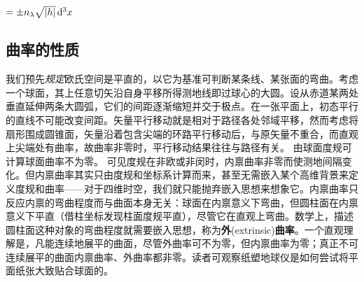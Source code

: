 $=\pm n_\lambda \sqrt{|h|}\dd[3]{x}$


\subsection{曲率的性质}\label{sec:curvature}

我们预先\textit{规定}欧氏空间是平直的，以它为基准可判断某条线、某张面的弯曲。考虑一个球面，其上任意切矢沿自身平移所得测地线即过球心的大圆。设从赤道某两处垂直延伸两条大圆弧，它们的间距逐渐缩短并交于极点。在一张平面上，初态平行的直线不可能改变间距。矢量平行移动就是相对于路径各处邻域平移，然而考虑将扇形围成圆锥面，矢量沿着包含尖端的环路平行移动后，与原矢量不重合，而直观上尖端处有曲率，故曲率非零时，平行移动结果往往与路径有关。
由球面度规可计算球面曲率不为零。
可见度规在非欧或非闵时，内禀曲率非零而使测地间隔变化。但内禀曲率其实只由度规和坐标系计算而来，甚至无需嵌入某个高维背景来定义度规和曲率——对于四维时空，我们就只能抛弃嵌入思想来想象它。内禀曲率只反应内禀的弯曲程度而与曲面本身无关：球面在内禀意义下弯曲，但圆柱面在内禀意义下平直（借柱坐标发现柱面度规平直），尽管它在直观上弯曲。数学上，描述圆柱面这种对象的弯曲程度就需要嵌入思想，称为\textbf{外}(extrinsic)\textbf{曲率}。一个直观理解是，凡能连续地展平的曲面，尽管外曲率可不为零，但内禀曲率为零；真正不可连续展平的曲面内禀曲率、外曲率都非零。读者可观察纸塑地球仪是如何尝试将平面纸张大致贴合球面的。

